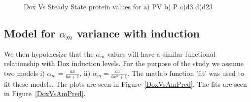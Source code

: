 \documentclass{article}
\begin{document}
\begin{figure}[h!]
\caption{Dox Vs Steady State protein values for a) PV b) P c)d3 d)d23}
\label{DoxVsSteadyState}
\end{figure}

\subsection{Model for $\alpha_m$ variance with induction}
We then hypothesize that the $\alpha_m$ values will have a similar functional relationship with Dox induction levels. For the purpose of the study we assume two models i) $\alpha_m = \frac{a x}{b x + 1}$, ii) $\alpha_m = \frac{a x^n}{b x^n + 1}$. The matlab function 'fit' was used to fit these models. The plots are seen in Figure~\ref{DoxVsAmPred}.    The fits are seen in Figure~\ref{DoxVsAmPred}. 
\pagebreak
\end{document}
